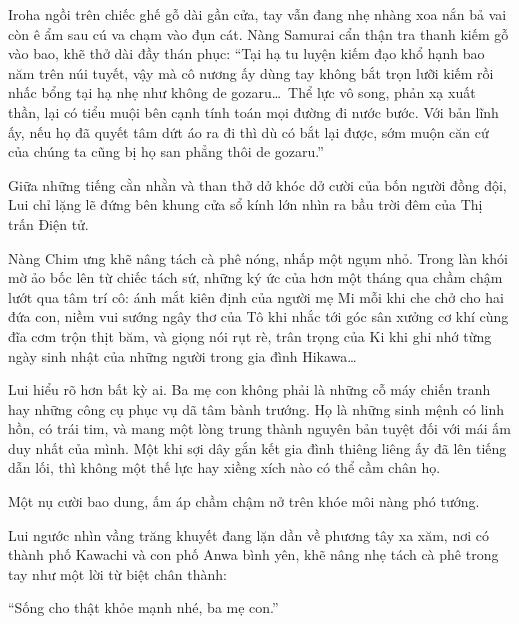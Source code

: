 \documentclass[../main.tex]{subfiles}
\begin{document}
Iroha ngồi trên chiếc ghế gỗ dài gần cửa, tay vẫn đang nhẹ nhàng xoa nắn bả vai còn ê ẩm sau cú va chạm vào đụn cát. Nàng Samurai cẩn thận tra thanh kiếm gỗ vào bao, khẽ thở dài đầy thán phục: ``Tại hạ tu luyện kiếm đạo khổ hạnh bao năm trên núi tuyết, vậy mà cô nương ấy dùng tay không bắt trọn lưỡi kiếm rồi nhấc bổng tại hạ nhẹ như không de gozaru\dots\ Thể lực vô song, phản xạ xuất thần, lại có tiểu muội bên cạnh tính toán mọi đường đi nước bước. Với bản lĩnh ấy, nếu họ đã quyết tâm dứt áo ra đi thì dù có bắt lại được, sớm muộn căn cứ của chúng ta cũng bị họ san phẳng thôi de gozaru.''

Giữa những tiếng cằn nhằn và than thở dở khóc dở cười của bốn người đồng đội, Lui chỉ lặng lẽ đứng bên khung cửa sổ kính lớn nhìn ra bầu trời đêm của Thị trấn Điện tử.

Nàng Chim ưng khẽ nâng tách cà phê nóng, nhấp một ngụm nhỏ. Trong làn khói mờ ảo bốc lên từ chiếc tách sứ, những ký ức của hơn một tháng qua chầm chậm lướt qua tâm trí cô: ánh mắt kiên định của người mẹ Mi mỗi khi che chở cho hai đứa con, niềm vui sướng ngây thơ của Tô khi nhắc tới góc sân xưởng cơ khí cùng đĩa cơm trộn thịt băm, và giọng nói rụt rè, trân trọng của Ki khi ghi nhớ từng ngày sinh nhật của những người trong gia đình Hikawa\dots

Lui hiểu rõ hơn bất kỳ ai. Ba mẹ con không phải là những cỗ máy chiến tranh hay những công cụ phục vụ dã tâm bành trướng. Họ là những sinh mệnh có linh hồn, có trái tim, và mang một lòng trung thành nguyên bản tuyệt đối với mái ấm duy nhất của mình. Một khi sợi dây gắn kết gia đình thiêng liêng ấy đã lên tiếng dẫn lối, thì không một thế lực hay xiềng xích nào có thể cầm chân họ.

Một nụ cười bao dung, ấm áp chầm chậm nở trên khóe môi nàng phó tướng.

Lui ngước nhìn vầng trăng khuyết đang lặn dần về phương tây xa xăm, nơi có thành phố Kawachi và con phố Anwa bình yên, khẽ nâng nhẹ tách cà phê trong tay như một lời từ biệt chân thành:

``Sống cho thật khỏe mạnh nhé, ba mẹ con.''
\end{document}
